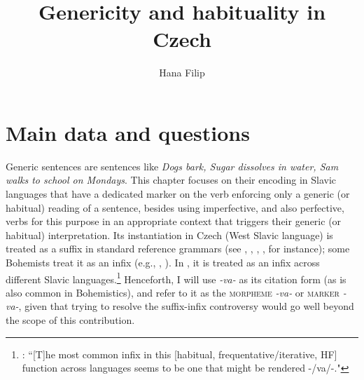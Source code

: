 \documentclass[output=paper,colorlinks,citecolor=brown]{langscibook}
\author{Hana Filip\orcid{}\affiliation{Heinrich Heine University Düsseldorf}}
\title{Genericity and habituality in Czech}
\begin{document}
\maketitle

% 


\section{Main data and questions} \label{fil:sec:introduction}







Generic sentences are sentences like \textit{Dogs bark, Sugar dissolves in water, 
Sam walks to school on Mondays}. This chapter focuses on their encoding in Slavic languages that have a dedicated marker on the verb 
enforcing only a generic (or habitual) reading of a sentence, besides 
using imperfective, and also perfective, verbs for this purpose in an  appropriate context that triggers their generic (or habitual) interpretation. Its instantiation in Czech (West Slavic language) 
is treated as a suffix in standard reference grammars 
(see \citealt[184]{petr1986mluvnice},
\citealt{dahl1995}, 
\citealt{Kosek2014}, \citealt{nuebler2017}, for instance); 
some Bohemists treat it as an infix (e.g., \citealt{kucera1981aspect}, \citealt{bily1986iterative}).
In \citet[23]{Genis2021}, it is treated as an infix across different Slavic languages.\footnote{\citet[23]{Genis2021}: ``[T]he most common infix in this [habitual, frequentative/iterative, HF] function across languages seems to be one that might be rendered -/va/-."} 
Henceforth, I will use \textit{-va-} as its citation form (as is also common in Bohemistics), and refer to it as the \textsc{morpheme} \textit{-va-} or \textsc{marker} \textit{-va-}, 
given that trying to resolve the suffix-infix controversy would  
go well beyond the scope of this contribution.
\end{document}
